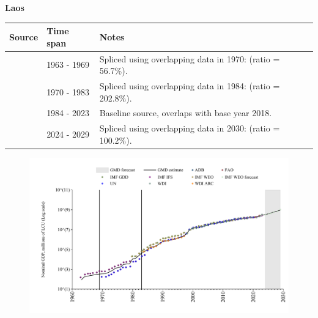 \documentclass[12pt,a4paper,landscape]{article}
\begin{document}
\begin{adjustbox}{max totalsize={\paperwidth}{\paperheight},center}
\begin{minipage}[t][\textheight][t]{\textwidth}
\vspace*{0.5cm}
{}
\begin{center}
{\Large\bfseries Laos}
\end{center}
\vspace{0.5cm}
\begin{table}[H]
\centering
\small
\begin{tabular}{|l|l|l|}
\hline
\textbf{Source} & \textbf{Time span} & \textbf{Notes} \\
\hline
\rowcolor{white}\cite{IMF_IFS}& 1963 - 1969 &Spliced using overlapping data in 1970: (ratio = 56.7\%).\\
\rowcolor{lightgray}\cite{UN}& 1970 - 1983 &Spliced using overlapping data in 1984: (ratio = 202.8\%).\\
\rowcolor{white}\cite{WDI}& 1984 - 2023 &Baseline source, overlaps with base year 2018.\\
\rowcolor{lightgray}\cite{IMF_WEO_forecast}& 2024 - 2029 &Spliced using overlapping data in 2030: (ratio = 100.2\%).\\
\hline
\end{tabular}
\end{table}
\begin{figure}[H]
\centering
\includegraphics[width=\textwidth,height=0.6\textheight,keepaspectratio]{graphs/LAO_nGDP.pdf}
\end{figure}
\end{minipage}
\end{adjustbox}
\end{document}
